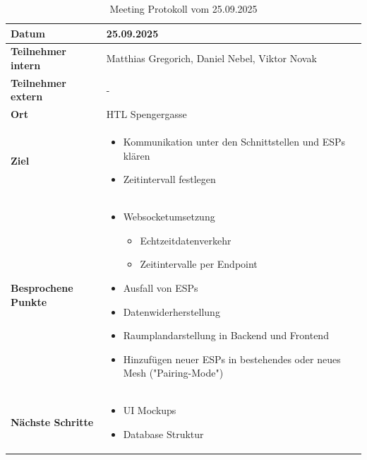 \documentclass{article}
\begin{document}
\begin{table}[H]
  \centering
  \begin{tabularx}{\textwidth}{|>{\columncolor{black!10}}l|X|}
    \hline
    \textbf{Datum} & 25.09.2025 \\
    \hline
    \textbf{Teilnehmer intern} & Matthias Gregorich, Daniel Nebel, Viktor Novak \\ 
    \hline
    \textbf{Teilnehmer extern} & - \\
    \hline
    \textbf{Ort} & HTL Spengergasse \\ 
    \hline
    \textbf{Ziel} &
    \vspace{-0.5em}
    \begin{itemize}
        \item Kommunikation unter den Schnittstellen und ESPs klären
        \item Zeitintervall festlegen
    \end{itemize} \\
    \hline
    \textbf{Besprochene Punkte} &
    \vspace{-0.5em}
    \begin{itemize}
        \item Websocketumsetzung
          \begin{itemize}[label=-,leftmargin=1.2em,nosep,topsep=0pt]
            \item Echtzeitdatenverkehr
            \item Zeitintervalle per Endpoint
          \end{itemize}
        \item Ausfall von ESPs 
        \item Datenwiderherstellung
        \item Raumplandarstellung in Backend und Frontend
        \item Hinzufügen neuer ESPs in bestehendes oder neues Mesh ("Pairing-Mode")
    \end{itemize} \\
    \hline
    \textbf{Nächste Schritte} &
    \vspace{-0.5em}
    \begin{itemize}
        \item UI Mockups
        \item Database Struktur
    \end{itemize} \\
    \hline
  \end{tabularx}
  \caption{Meeting Protokoll vom 25.09.2025}
  \label{tab:meeting-25-09-2025}
\end{table}
\end{document}
